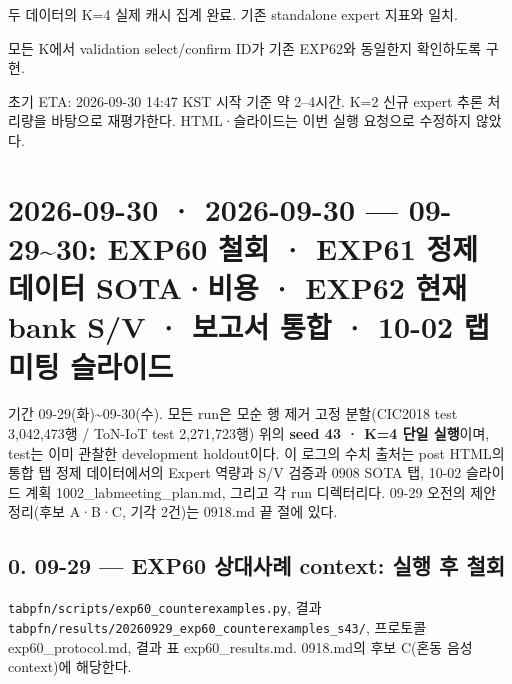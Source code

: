 \par\noindent \textbullet\enspace 두 데이터의 K=\allowbreak{}4 실제 캐시 집계 완료. 기존 standalone expert 지표와 일치.


\par\noindent \textbullet\enspace 모든 K에서 validation select/\allowbreak{}confirm ID가 기존 EXP62와 동일한지 확인하도록 구현.


초기 ETA: 2026-09-30 14:47 KST 시작 기준 약 2–4시간. K=\allowbreak{}2 신규 expert 추론 처리량을 바탕으로 재평가한다. HTML·슬라이드는 이번 실행 요청으로 수정하지 않았다.



\section{2026-09-30 · 2026-09-30 — 09-29\textasciitilde{}30: EXP60 철회 · EXP61 정제 데이터 SOTA·비용 · EXP62 현재 bank S/\allowbreak{}V · 보고서 통합 · 10-02 랩미팅 슬라이드}
\label{report:20260930_0930}
기간 09-29(화)\textasciitilde{}09-30(수). 모든 run은 모순 행 제거 고정 분할(CIC2018 test 3,042,473행 /\allowbreak{} ToN-IoT test 2,271,723행) 위의 \textbf{seed 43 · K=\allowbreak{}4 단일 실행}이며, test는 이미 관찰한 development holdout이다. 이 로그의 수치 출처는 post HTML의 통합 탭 정제 데이터에서의 Expert 역량과 S/\allowbreak{}V 검증과 0908 SOTA 탭, 10-02 슬라이드 계획 1002\_\allowbreak{}labmeeting\_\allowbreak{}plan.md, 그리고 각 run 디렉터리다. 09-29 오전의 제안 정리(후보 A·B·C, 기각 2건)는 0918.md 끝 절에 있다.



\subsection{0. 09-29 — EXP60 상대사례 context: 실행 후 철회}
\texttt{tabpfn/\allowbreak{}\allowbreak{}s\allowbreak{}cripts/\allowbreak{}\allowbreak{}e\allowbreak{}xp60\_\allowbreak{}\allowbreak{}cou\allowbreak{}nterexam\allowbreak{}ples.\allowbreak{}py}, 결과 \texttt{tabpfn/\allowbreak{}\allowbreak{}r\allowbreak{}esults/\allowbreak{}\allowbreak{}2\allowbreak{}0260929\_\allowbreak{}\allowbreak{}exp60\_\allowbreak{}\allowbreak{}co\allowbreak{}unterexa\allowbreak{}mples\_\allowbreak{}\allowbreak{}s4\allowbreak{}3/\allowbreak{}\allowbreak{}}, 프로토콜 exp60\_\allowbreak{}protocol.md, 결과 표 exp60\_\allowbreak{}results.md. 0918.md의 후보 C(혼동 음성 context)에 해당한다.

